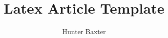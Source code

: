 \documentclass{article}
\title{Latex Article Template}
\author{Hunter Baxter}
\begin{document}
\maketitle

\tableofcontents
\cite{test}
\printbibliography
\end{document}
